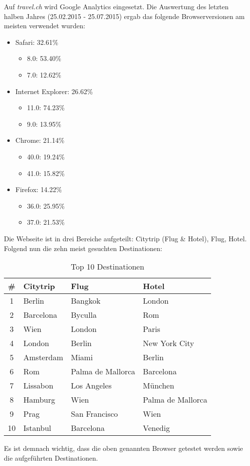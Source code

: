 Auf \textit{travel.ch} wird Google Analytics eingesetzt. Die Auswertung des letzten halben Jahres (25.02.2015 - 25.07.2015) ergab das folgende Browserversionen am meisten verwendet wurden:
\begin{itemize}
\item Safari: 32.61\%
	\begin{itemize}
			\item 8.0: 53.40\%
			\item 7.0: 12.62\%
	\end{itemize}
\item Internet Explorer: 26.62\%
	\begin{itemize}
			\item 11.0: 74.23\%
			\item 9.0: 13.95\%
	\end{itemize}
\item Chrome: 21.14\%
	\begin{itemize}
			\item 40.0: 19.24\%
			\item 41.0: 15.82\%
	\end{itemize}
\item Firefox: 14.22\%
	\begin{itemize}
			\item 36.0: 25.95\%
			\item 37.0: 21.53\%
	\end{itemize}
\end{itemize}

Die Webseite ist in drei Bereiche aufgeteilt: Citytrip (Flug \& Hotel), Flug, Hotel. Folgend nun die zehn meist gesuchten Destinationen:
\begin{table}[H] 
	\caption{Top 10 Destinationen}
	\centering
	\label{sec:Recherche:Zielgruppe:top10}
	
	\begin{tabular}{ | c | l | l | l | } 
		\hline 
		\textbf{\#} & \textbf{Citytrip} & \textbf{Flug} & \textbf{Hotel} \\ \hline 
		1 & Berlin & Bangkok & London \\ \hline
		2 & Barcelona & Byculla & Rom \\ \hline
		3 & Wien & London & Paris \\ \hline
		4 & London & Berlin & New York City \\ \hline
		5 & Amsterdam & Miami & Berlin \\ \hline
		6 & Rom & Palma de Mallorca & Barcelona \\ \hline
		7 & Lissabon & Los Angeles & München \\ \hline
		8 & Hamburg & Wien  & Palma de Mallorca \\ \hline
		9 & Prag & San Francisco & Wien \\ \hline
		10 & Istanbul & Barcelona & Venedig \\ \hline
	\end{tabular} 
\end{table}

Es ist demnach wichtig, dass die oben genannten Browser getestet werden sowie die aufgeführten Destinationen.